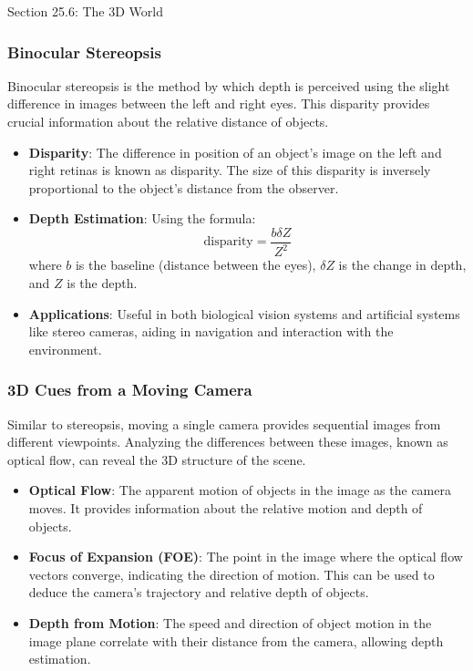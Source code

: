 \begin{notes}{Section 25.6: The 3D World}
    \subsubsection*{Binocular Stereopsis}
    
    Binocular stereopsis is the method by which depth is perceived using the slight difference in images between the left and right eyes. This disparity provides crucial information about the relative distance 
    of objects.
    
    \begin{highlight}
    
        \begin{itemize}
            \item \textbf{Disparity}: The difference in position of an object's image on the left and right retinas is known as disparity. The size of this disparity is inversely proportional to the object's 
            distance from the observer.
            \item \textbf{Depth Estimation}: Using the formula:
            \[
            \text{disparity} = \frac{b \delta Z}{Z^2}
            \]
            where \( b \) is the baseline (distance between the eyes), \( \delta Z \) is the change in depth, and \( Z \) is the depth.
            \item \textbf{Applications}: Useful in both biological vision systems and artificial systems like stereo cameras, aiding in navigation and interaction with the environment.
        \end{itemize}
    
    \end{highlight}
    
    \subsubsection*{3D Cues from a Moving Camera}
    
    Similar to stereopsis, moving a single camera provides sequential images from different viewpoints. Analyzing the differences between these images, known as optical flow, can reveal the 3D structure 
    of the scene.
    
    \begin{highlight}
    
        \begin{itemize}
            \item \textbf{Optical Flow}: The apparent motion of objects in the image as the camera moves. It provides information about the relative motion and depth of objects.
            \item \textbf{Focus of Expansion (FOE)}: The point in the image where the optical flow vectors converge, indicating the direction of motion. This can be used to deduce the camera's trajectory 
            and relative depth of objects.
            \item \textbf{Depth from Motion}: The speed and direction of object motion in the image plane correlate with their distance from the camera, allowing depth estimation.
        \end{itemize}
    

\end{highlight}
\end{notes}
